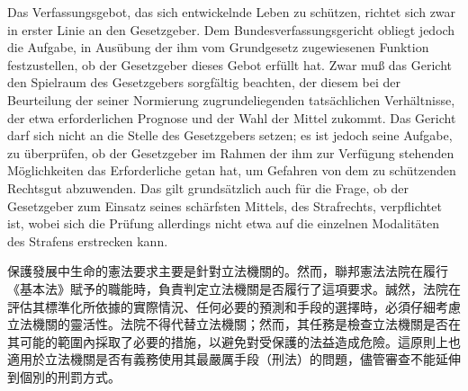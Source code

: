 \documentclass[12pt]{article}
\begin{document}
\syncleft
\begin{sourcepara}
Das Verfassungsgebot, das sich entwickelnde Leben zu schützen, richtet sich zwar in erster Linie an den Gesetzgeber. Dem Bundesverfassungsgericht obliegt jedoch die Aufgabe, in Ausübung der ihm vom Grundgesetz zugewiesenen Funktion festzustellen, ob der Gesetzgeber dieses Gebot erfüllt hat. Zwar muß das Gericht den Spielraum des Gesetzgebers sorgfältig beachten, der diesem bei der Beurteilung der seiner Normierung zugrundeliegenden tatsächlichen Verhältnisse, der etwa erforderlichen Prognose und der Wahl der Mittel zukommt. Das Gericht darf sich nicht an die Stelle des Gesetzgebers setzen; es ist jedoch seine Aufgabe, zu überprüfen, ob der Gesetzgeber im Rahmen der ihm zur Verfügung stehenden Möglichkeiten das Erforderliche getan hat, um Gefahren von dem zu schützenden Rechtsgut abzuwenden. Das gilt grundsätzlich auch für die Frage, ob der Gesetzgeber zum Einsatz seines schärfsten Mittels, des Strafrechts, verpflichtet ist, wobei sich die Prüfung allerdings nicht etwa auf die einzelnen Modalitäten des Strafens erstrecken kann.
\end{sourcepara}
\begin{transpara}
保護發展中生命的憲法要求主要是針對立法機關的。然而，聯邦憲法法院在履行《基本法》賦予的職能時，負責判定立法機關是否履行了這項要求。誠然，法院在評估其標準化所依據的實際情況、任何必要的預測和手段的選擇時，必須仔細考慮立法機關的靈活性。法院不得代替立法機關；然而，其任務是檢查立法機關是否在其可能的範圍內採取了必要的措施，以避免對受保護的法益造成危險。這原則上也適用於立法機關是否有義務使用其最嚴厲手段（刑法）的問題，儘管審查不能延伸到個別的刑罰方式。
\end{transpara}
\end{document}
